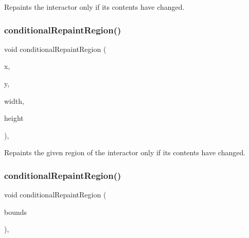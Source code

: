 Repaints the interactor only if its contents have changed. 

\mbox{\label{classGDrawingSurface_aedd4b792311d946eeaf44b0de337a408}} 
\subsubsection{\texorpdfstring{conditional\+Repaint\+Region()}{conditionalRepaintRegion()}\hspace{0.1cm}{\footnotesize\ttfamily [1/2]}}
{\footnotesize\ttfamily void conditional\+Repaint\+Region (\begin{DoxyParamCaption}\item[{int}]{x,  }\item[{int}]{y,  }\item[{int}]{width,  }\item[{int}]{height }\end{DoxyParamCaption})\hspace{0.3cm}{\ttfamily [virtual]}, {\ttfamily [inherited]}}



Repaints the given region of the interactor only if its contents have changed. 

\mbox{\label{classGDrawingSurface_a3932a12278752db368e24fa404e446aa}} 
\subsubsection{\texorpdfstring{conditional\+Repaint\+Region()}{conditionalRepaintRegion()}\hspace{0.1cm}{\footnotesize\ttfamily [2/2]}}
{\footnotesize\ttfamily void conditional\+Repaint\+Region (\begin{DoxyParamCaption}\item[{const \mbox{\hyperlink{structGRectangle}{G\+Rectangle}} \&}]{bounds }\end{DoxyParamCaption})\hspace{0.3cm}{\ttfamily [virtual]}, {\ttfamily [inherited]}}



